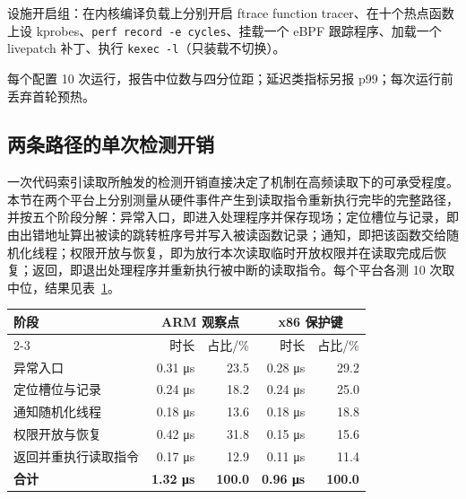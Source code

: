 设施开启组：在内核编译负载上分别开启 ftrace function tracer、在十个热点函数上设 kprobes、\lstinline[breaklines=false]@perf record -e cycles@、挂载一个 eBPF 跟踪程序、加载一个 livepatch 补丁、执行 \lstinline[breaklines=false]@kexec -l@（只装载不切换）。

每个配置 10 次运行，报告中位数与四分位距；延迟类指标另报 p99；每次运行前丢弃首轮预热。

\subsection{两条路径的单次检测开销}

一次代码索引读取所触发的检测开销直接决定了机制在高频读取下的可承受程度。本节在两个平台上分别测量从硬件事件产生到读取指令重新执行完毕的完整路径，并按五个阶段分解：异常入口，即进入处理程序并保存现场；定位槽位与记录，即由出错地址算出被读的跳转桩序号并写入被读函数记录；通知，即把该函数交给随机化线程；权限开放与恢复，即为放行本次读取临时开放权限并在读取完成后恢复；返回，即退出处理程序并重新执行被中断的读取指令。每个平台各测 10 次取中位，结果见表~\ref{tab:4-2}。

\begin{table}[!htbp]
    \label{tab:4-2}
    \centering
    \footnotesize
    \setlength{\tabcolsep}{5pt}
    \renewcommand{\arraystretch}{1.15}
    \begin{tabular}{lrrrr}
        \hline
        阶段 & \multicolumn{2}{c}{ARM 观察点} & \multicolumn{2}{c}{x86 保护键}\\
        \cline{2-3}\cline{4-5}
         & 时长 & 占比/\% & 时长 & 占比/\%\\
        \hline
        异常入口 & 0.31 μs & 23.5 & 0.28 μs & 29.2\\
        定位槽位与记录 & 0.24 μs & 18.2 & 0.24 μs & 25.0\\
        通知随机化线程 & 0.18 μs & 13.6 & 0.18 μs & 18.8\\
        权限开放与恢复 & 0.42 μs & 31.8 & 0.15 μs & 15.6\\
        返回并重执行读取指令 & 0.17 μs & 12.9 & 0.11 μs & 11.4\\
        \hline
        \textbf{合计} & \textbf{1.32 μs} & \textbf{100.0} & \textbf{0.96 μs} & \textbf{100.0}\\
        \hline
    \end{tabular}
\end{table}

